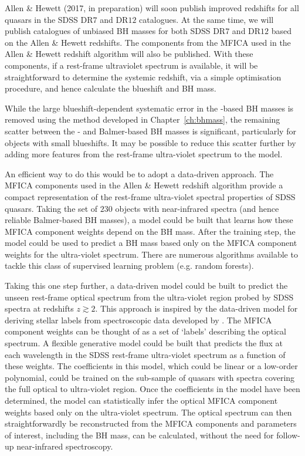 Allen \& Hewett (2017, in preparation) will soon publish improved redshifts for all quasars in the SDSS DR$7$ and DR$12$ catalogues. 
At the same time, we will publish catalogues of unbiased BH masses for both SDSS DR$7$ and DR$12$ based on the Allen \& Hewett redshifts. 
The components from the MFICA used in the Allen \& Hewett redshift algorithm will also be published.
With these components, if a rest-frame ultraviolet spectrum is available, it will be straightforward to determine the systemic redshift, via a simple optimisation procedure, and hence calculate the  blueshift and BH mass. 

While the large  blueshift-dependent systematic error in the -based BH masses is removed using the method developed in Chapter~\ref{ch:bhmass}, the remaining scatter between the - and Balmer-based BH masses is significant, particularly for objects with small  blueshifts.
It may be possible to reduce this scatter further by adding more features from the rest-frame ultra-violet spectrum to the model. 

An efficient way to do this would be to adopt a data-driven approach. 
The MFICA components used in the Allen \& Hewett redshift algorithm provide a compact representation of the rest-frame ultra-violet spectral properties of SDSS quasars.  
Taking the set of $230$ objects with near-infrared spectra (and hence reliable Balmer-based BH masses), a model could be built that learns how these MFICA component weights depend on the BH mass. 
After the training step, the model could be used to predict a BH mass based only on the MFICA component weights for the ultra-violet spectrum.
There are numerous algorithms available to tackle this class of supervised learning problem (e.g. random forests). 

Taking this one step further, a data-driven model could be built to predict the unseen rest-frame optical spectrum from the ultra-violet region probed by SDSS spectra at redshifts $z\gtrsim2$.
This approach is inspired by the data-driven model for deriving stellar labels from spectroscopic data developed by \citet{ness15}.
The MFICA component weights can be thought of as a set of `labels' describing the optical spectrum. 
A flexible generative model could be built that predicts the flux at each wavelength in the SDSS rest-frame ultra-violet spectrum as a function of these weights.
The coefficients in this model, which could be linear or a low-order polynomial, could be trained on the sub-sample of quasars with spectra covering the full optical to ultra-violet region. 
Once the coefficients in the model have been determined, the model can statistically infer the optical MFICA component weights based only on the ultra-violet spectrum. 
The optical spectrum can then straightforwardly be reconstructed from the MFICA components and parameters of interest, including the BH mass, can be calculated, without the need for follow-up near-infrared spectroscopy. 

